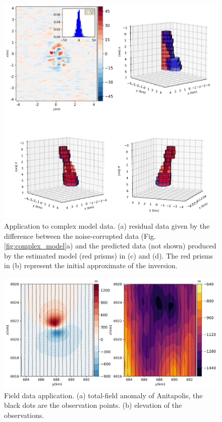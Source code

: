 \begin{figure}
    \centering
    \includegraphics[scale=.5]{figures/complex_results.png}
    \caption{Application to complex model data. (a) residual data given by the difference between the noise-corrupted data (Fig. \ref{fig:complex_model}a) and the predicted data (not shown) produced by the estimated model (red prisms) in (c) and (d). The red prisms in (b) represent the initial approximate of the inversion.
}
    \label{fig:complex_result}
\end{figure}

\begin{figure}
    \centering
    \includegraphics[scale=.5]{figures/anitapolis_data_alt.png}
    \caption{Field data application. (a) total-field anomaly of Anitapolis, the black dots are the observation points. (b) elevation of the observations.
}
    \label{fig:real_data}
\end{figure}

